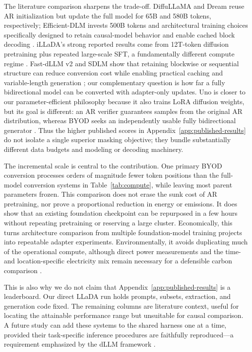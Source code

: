 \documentclass{article}
\newcommand{\method}{BYOD}
\begin{document}
The literature comparison sharpens the trade-off. DiffuLLaMA and Dream reuse AR initialization but update the full model for 65B and 580B tokens, respectively; Efficient-DLM invests 500B tokens and architectural training choices specifically designed to retain causal-model behavior and enable cached block decoding \citep{gong2025diffullama,ye2025dream,fu2025efficientdlm}. iLLaDA's strong reported results come from 12T-token diffusion pretraining plus repeated large-scale SFT, a fundamentally different compute regime \citep{nie2026illada}. Fast-dLLM v2 and SDLM show that retaining blockwise or sequential structure can reduce conversion cost while enabling practical caching and variable-length generation \citep{wu2025fastdllmv2,liu2025sdlm}; our complementary question is how far a fully bidirectional model can be converted with adapter-only updates. Uno is closer to our parameter-efficient philosophy because it also trains LoRA diffusion weights, but its goal is different: an AR verifier guarantees samples from the original AR distribution, whereas \method{} seeks an independently usable fully bidirectional generator \citep{sahoo2026uno}. Thus the higher published scores in Appendix~\ref{app:published-results} do not isolate a single superior masking objective; they bundle substantially different data budgets and modeling or decoding machinery.

The incremental scale is central to the contribution. One primary \method{} conversion processes orders of magnitude fewer token positions than the full-model conversion systems in Table~\ref{tab:compute}, while leaving most parent parameters frozen. This comparison does not erase the sunk cost of AR pretraining, nor prove a proportional reduction in energy or emissions. It does show that an existing foundation checkpoint can be repurposed in a few hours without repeating pretraining or reserving a large cluster. Economically, this turns architecture comparison from multiple foundation-model training projects into repeatable adapter experiments. Environmentally, it avoids duplicating much of the operational compute, although direct power measurements and the time- and location-specific electricity mix remain necessary for a defensible carbon comparison \citep{strubell2019energy,patterson2021carbon}.

This is also why we do not claim that Appendix~\ref{app:published-results} is a leaderboard. Our direct LLaDA run holds prompts, subsets, extraction, and generation code fixed. The remaining columns are literature context, useful for locating the attainable performance range but unsuitable for causal comparison. A future study can add these systems to the shared harness one at a time, provided their task-specific inference procedures are faithfully reproduced---a requirement emphasized by the dLLM framework \citep{zhou2026dllm}.
\end{document}
